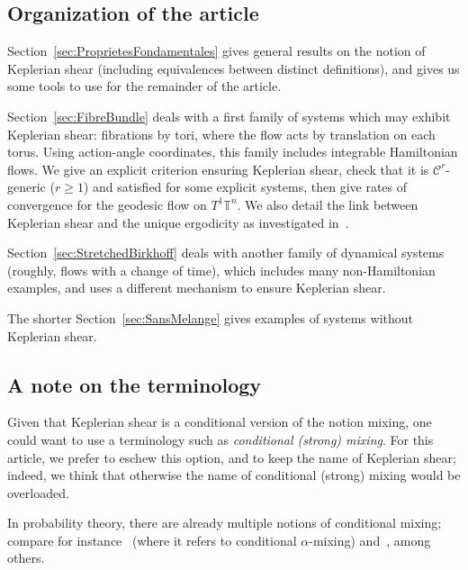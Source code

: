 \documentclass[AHL,Unicode,longabstracts]{cedram}
\newcommand{\Tbb}{\mathbb{T}}
\newcommand{\Ccal}{\mathcal{C}}
\begin{document}
\subsection{Organization of the article}

Section~\ref{sec:ProprietesFondamentales} gives general results on the notion of Keplerian shear (including equivalences between distinct definitions), and gives us some tools to use for the remainder of the article.


Section~\ref{sec:FibreBundle} deals with a first family of systems which may exhibit Keplerian shear: fibrations by tori, where the flow acts by translation on each torus. Using action-angle coordinates, this family includes integrable Hamiltonian flows. We give an explicit criterion ensuring Keplerian shear, check that it is $\Ccal^r$-generic ($r \geq 1$) and satisfied for some explicit systems, then give rates of convergence for the geodesic flow on $T^1 \Tbb^n$. We also detail the link between Keplerian shear and the unique ergodicity as investigated in~\cite{Maucourant:2016}.


Section~\ref{sec:StretchedBirkhoff} deals with another family of dynamical systems (roughly, flows with a change of time), which includes many non-Hamiltonian examples, and uses a different mechanism to ensure Keplerian shear.


The shorter Section~\ref{sec:SansMelange} gives examples of systems without Keplerian shear.


\subsection{A note on the terminology}

Given that Keplerian shear is a conditional version of the notion mixing, one could want to use a terminology such as \emph{conditional (strong) mixing}. For this article, we prefer to eschew this option, and to keep the name of Keplerian shear; indeed, we think that otherwise the name of conditional (strong) mixing would be overloaded.


In probability theory, there are already multiple notions of conditional mixing; compare for instance~\cite{Rao:2009} (where it refers to conditional $\alpha$-mixing) and~\cite{KacemLoiselMaumeDeschamps:2016}, among others.
\end{document}
